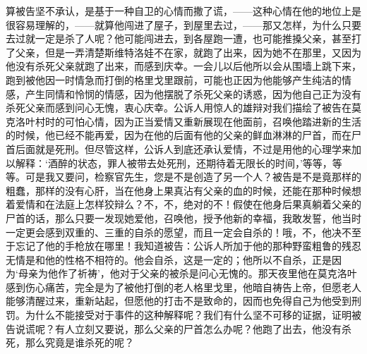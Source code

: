 算被告坚不承认，是基于一种自卫的心情而撒了谎，——这种心情在他的地位上是很容易理解的，——就算他闯进了屋子，到屋里去过，——那又怎样，为什么只要去过就一定是杀了人呢？他可能闯进去，到各屋跑一遭，也可能推搡父亲，甚至打了父亲，但是一弄清楚斯维特洛娃不在家，就跑了出来，因为她不在那里，又因为他没有杀死父亲就跑了出来，而感到庆幸。一会儿以后他所以会从围墙上跳下来，跑到被他因一时情急而打倒的格里戈里跟前，可能也正因为他能够产生纯洁的情感，产生同情和怜悯的情感，因为他摆脱了杀死父亲的诱惑，因为他自己正为没有杀死父亲而感到问心无愧，衷心庆幸。公诉人用惊人的雄辩对我们描绘了被告在莫克洛叶村时的可怕心情，因为正当爱情又重新展现在他面前，召唤他踏进新的生活的时候，他已经不能再爱，因为在他的后面有他的父亲的鲜血淋淋的尸首，而在尸首后面就是死刑。但尽管这样，公诉人到底还承认爱情，不过是用他的心理学来加以解释：‘酒醉的状态，罪人被带去处死刑，还期待着无限长的时间，’等等，等等。可是我又要问，检察官先生，您是不是创造了另一个人？被告是不是竟那样的粗蠢，那样的没有心肝，当在他身上果真沾有父亲的血的时候，还能在那种时候想着爱情和在法庭上怎样狡辩么？不，不，绝对的不！假使在他身后果真躺着父亲的尸首的话，那么只要一发现她爱他，召唤他，授予他新的幸福，我敢发誓，他当时一定更会感到双重的、三重的自杀的愿望，而且一定会自杀的！哦，不，他决不至于忘记了他的手枪放在哪里！我知道被告：公诉人所加于他的那种野蛮粗鲁的残忍无情是和他的性格不相符的。他会自杀，这是一定的；他所以不自杀，正是因为‘母亲为他作了祈祷’，他对于父亲的被杀是问心无愧的。那天夜里他在莫克洛叶感到伤心痛苦，完全是为了被他打倒的老人格里戈里，他暗自祷告上帝，但愿老人能够清醒过来，重新站起，但愿他的打击不是致命的，因而也免得自己为他受到刑罚。为什么不能接受对于事件的这种解释呢？我们有什么坚不可移的证据，证明被告说谎呢？有人立刻又要说，那么父亲的尸首怎么办呢？他跑了出去，他没有杀死，那么究竟是谁杀死的呢？
